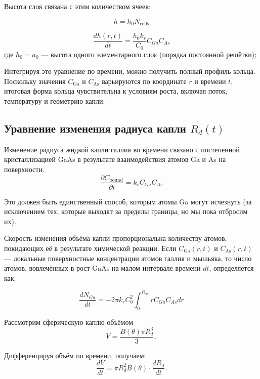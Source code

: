 \documentclass[14pt,oneside]{extarticle}
\begin{document}
Высота слоя связана с этим количеством ячеек:

\[
    h=h_{0}N_{\text{cells}}
\]

\[
\frac{dh\left(r,t\right)}{dt}=\frac{h_{0}k_{r}}{C_{0}}C_{Ga}C_{As}
\]
где $h_0=a_0$ — высота одного элементарного слоя (порядка постоянной решётки);

Интегрируя это уравнение по времени, можно получить полный профиль кольца. Поскольку значения $C_{\text{Ga}}$ и $C_{\text{As}}$ варьируются по координате $r$ и времени $t$, итоговая форма кольца чувствительна к условиям роста, включая поток, температуру и геометрию капли.

\subsection{Уравнение изменения радиуса капли \texorpdfstring{$R_d(t)$}{Rd(t)}}

Изменение радиуса жидкой капли галлия во времени связано с постепенной кристаллизацией GaAs в результате взаимодействия атомов Ga и As на поверхности.
\begin{equation}
\frac{\partial C_{\text{bound}}}{\partial t}=k_{r}C_{Ga}C_{As}
\end{equation}

Это должен быть единственный способ, которым атомы Ga могут исчезнуть (за исключением тех, которые выходят за пределы границы, но мы пока отбросим их). 

Скорость изменения объёма капли пропорциональна количеству атомов, покидающих её в результате химической реакции. Если \( C_{\text{Ga}}(r,t) \) и \( C_{\text{As}}(r,t) \) — локальные поверхностные концентрации атомов галлия и мышьяка, то число атомов, вовлечённых в рост GaAs на малом интервале времени \( dt \), определяется как:

\begin{equation}
\frac{dN_{Ga}}{dt}=-2\pi k_{r}C_{0}^{2}\int_{0}^{R_{\infty}}rC_{Ga}C_{As}dr
\end{equation}

Рассмотрим сферическую каплю объёмом
\begin{equation}
V = \frac{B(\theta)\pi R_d^3}{3},
\end{equation}

Дифференцируя объём по времени, получаем:
\begin{equation}
\frac{dV}{dt} = {\pi R_d^2B(\theta)} \cdot \frac{dR_d}{dt}.
\label{eq:dVdt_from_R}
\end{equation}
\end{document}
